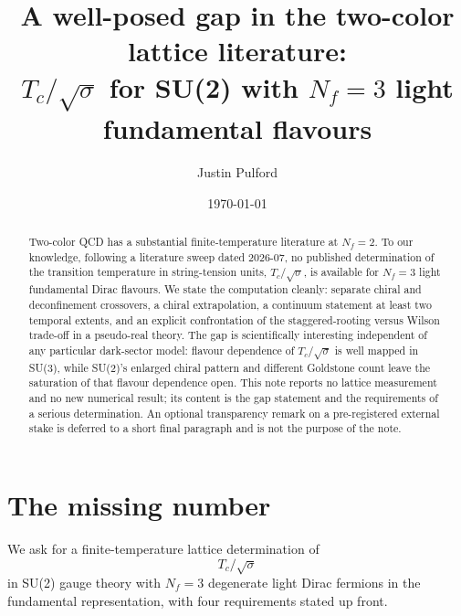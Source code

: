 \documentclass[aps,prd,twocolumn,superscriptaddress,nofootinbib,10pt]{revtex4-2}
\begin{document}
\title{A well-posed gap in the two-color lattice literature:\\
$T_c/\sqrt{\sigma}$ for SU(2) with $N_f=3$ light fundamental flavours}

\author{Justin Pulford}

\date{\today}

\begin{abstract}
Two-color QCD has a substantial finite-temperature literature at $N_f=2$. To our knowledge,
following a literature sweep dated 2026-07, no published determination of the transition
temperature in string-tension units, $T_c/\sqrt{\sigma}$, is available for $N_f=3$ light
fundamental Dirac flavours. We state the computation cleanly: separate chiral and deconfinement
crossovers, a chiral extrapolation, a continuum statement at least two temporal extents, and an
explicit confrontation of the staggered-rooting versus Wilson trade-off in a pseudo-real theory.
The gap is scientifically interesting independent of any particular dark-sector model: flavour
dependence of $T_c/\sqrt{\sigma}$ is well mapped in SU(3), while SU(2)'s enlarged chiral pattern
and different Goldstone count leave the saturation of that flavour dependence open. This note
reports no lattice measurement and no new numerical result; its content is the gap statement and
the requirements of a serious determination. An optional transparency remark on a pre-registered
external stake is deferred to a short final paragraph and is not the purpose of the note.
\end{abstract}

\maketitle

\section{The missing number}

We ask for a finite-temperature lattice determination of
%
\begin{equation}
  T_c/\sqrt{\sigma}
\end{equation}
%
in SU(2) gauge theory with $N_f=3$ degenerate light Dirac fermions in the fundamental
representation, with four requirements stated up front.
\end{document}
